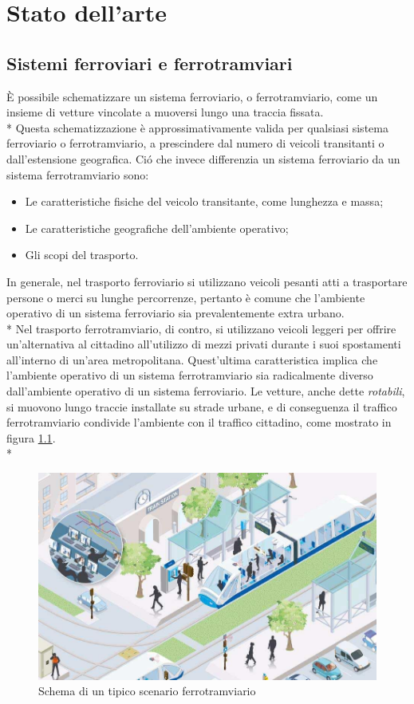 \chapter{Stato dell'arte}
\section{Sistemi ferroviari e ferrotramviari}
\`E possibile schematizzare un sistema ferroviario, o ferrotramviario, come un insieme di vetture vincolate a muoversi lungo una traccia fissata.\\*
Questa schematizzazione \`e approssimativamente valida per qualsiasi sistema ferroviario o ferrotramviario, a prescindere dal numero di veicoli transitanti o dall'estensione geografica. Ci\'o che invece differenzia un sistema ferroviario da un sistema ferrotramviario sono:
\begin{itemize}
		\item Le caratteristiche fisiche del veicolo transitante, come lunghezza e massa;
		\item Le caratteristiche geografiche dell'ambiente operativo;
		\item Gli scopi del trasporto.
\end{itemize}
In generale, nel trasporto ferroviario si utilizzano veicoli pesanti atti a trasportare persone o merci su lunghe percorrenze, pertanto \`e comune che l'ambiente operativo di un sistema ferroviario sia prevalentemente extra urbano.\\*
Nel trasporto ferrotramviario, di contro, si utilizzano veicoli leggeri per offrire un'alternativa al cittadino all'utilizzo di mezzi privati durante i suoi spostamenti all'interno di un'area metropolitana. Quest'ultima caratteristica implica che l'ambiente operativo di un sistema ferrotramviario sia radicalmente diverso dall'ambiente operativo di un sistema ferroviario. Le vetture, anche dette \emph{rotabili}, si muovono lungo traccie installate su strade urbane, e di conseguenza il traffico ferrotramviario condivide l'ambiente con il traffico cittadino, come mostrato in figura \ref{fig:tramschema}.\\*
\begin{figure}[h]
		\centering
		\includegraphics[width=0.7\linewidth]{img/twschema}
		\caption{Schema di un tipico scenario ferrotramviario}
		\label{fig:tramschema}
\end{figure}
